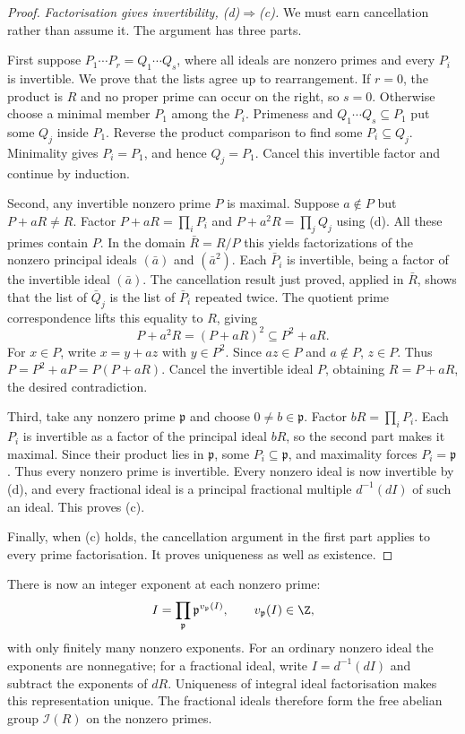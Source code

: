 \begin{proof}
\emph{Factorisation gives invertibility, (d)$\Rightarrow$(c).} We must earn cancellation rather than assume it. The argument has three parts.

First suppose $P_1\cdots P_r=Q_1\cdots Q_s$, where all ideals are nonzero primes and every $P_i$ is invertible. We prove that the lists agree up to rearrangement. If $r=0$, the product is $R$ and no proper prime can occur on the right, so $s=0$. Otherwise choose a minimal member $P_1$ among the $P_i$. Primeness and $Q_1\cdots Q_s\subseteq P_1$ put some $Q_j$ inside $P_1$. Reverse the product comparison to find some $P_i\subseteq Q_j$. Minimality gives $P_i=P_1$, and hence $Q_j=P_1$. Cancel this invertible factor and continue by induction.

Second, any invertible nonzero prime $P$ is maximal. Suppose $a\notin P$ but $P+aR\ne R$. Factor $P+aR=\prod_iP_i$ and $P+a^2R=\prod_jQ_j$ using (d). All these primes contain $P$. In the domain $\bar R=R/P$ this yields factorizations of the nonzero principal ideals $(\bar a)$ and $(\bar a^2)$. Each $\bar P_i$ is invertible, being a factor of the invertible ideal $(\bar a)$. The cancellation result just proved, applied in $\bar R$, shows that the list of $\bar Q_j$ is the list of $\bar P_i$ repeated twice. The quotient prime correspondence lifts this equality to $R$, giving
\[
 P+a^2R=(P+aR)^2\subseteq P^2+aR.
\]
For $x\in P$, write $x=y+az$ with $y\in P^2$. Since $az\in P$ and $a\notin P$, $z\in P$. Thus $P=P^2+aP=P(P+aR)$. Cancel the invertible ideal $P$, obtaining $R=P+aR$, the desired contradiction.

Third, take any nonzero prime $\mathfrak p$ and choose $0\ne b\in\mathfrak p$. Factor $bR=\prod_iP_i$. Each $P_i$ is invertible as a factor of the principal ideal $bR$, so the second part makes it maximal. Since their product lies in $\mathfrak p$, some $P_i\subseteq\mathfrak p$, and maximality forces $P_i=\mathfrak p$. Thus every nonzero prime is invertible. Every nonzero ideal is now invertible by (d), and every fractional ideal is a principal fractional multiple $d^{-1}(dI)$ of such an ideal. This proves (c).

Finally, when (c) holds, the cancellation argument in the first part applies to every prime factorisation. It proves uniqueness as well as existence.
\end{proof}

There is now an integer exponent at each nonzero prime:
\[
 I=\prod_{\mathfrak p}\mathfrak p^{v_{\mathfrak p}(I)},
 \qquad v_{\mathfrak p}(I)\in\Z,
\]
with only finitely many nonzero exponents. For an ordinary nonzero ideal the exponents are nonnegative; for a fractional ideal, write $I=d^{-1}(dI)$ and subtract the exponents of $dR$. Uniqueness of integral ideal factorisation makes this representation unique. The fractional ideals therefore form the free abelian group $\mathcal I(R)$ on the nonzero primes.

